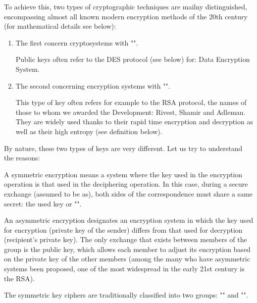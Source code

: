 	To achieve this, two types of cryptographic techniques are mailny distinguished, encompassing almost all known modern encryption methods of the 20th century (for mathematical details see below):
	\begin{enumerate}
		\item The first concern cryptosystems with "".
		\begin{tcolorbox}[title=Remark,colframe=black,arc=10pt]
		Public keys often refer to the DES protocol (see below) for: Data Encryption System.
		\end{tcolorbox}
		
		\item The second concerning encryption systems with "".
		\begin{tcolorbox}[title=Remark,colframe=black,arc=10pt]
		This type of key often refers for example to the RSA protocol, the names of those to whom we awarded the Development: Rivest, Shamir and Adleman. They are widely used thanks to their rapid time encryption and decryption as well as their high entropy (see definition below).
		\end{tcolorbox}
	\end{enumerate}
	By nature, these two types of keys are very different. Let us try to understand the reasons:
		
		A symmetric encryption means a system where the key used in the encryption operation is that used in the deciphering operation. In this case, during a secure exchange (assumed to be as), both sides of the correspondence must share a same secret: the used key or "".
		
		An asymmetric encryption designates an encryption system in which the key used for encryption (private key of the sender) differs from that used for decryption (recipient's private key). The only exchange that exists between members of the group is the public key, which allows each member to adjust its encryption based on the private key of the other members (among the many who have asymmetric systems been proposed, one of the most widespread in the early 21st century is the RSA).
		
		The symmetric key ciphers are traditionally classified into two groups:  "" and "".
		
